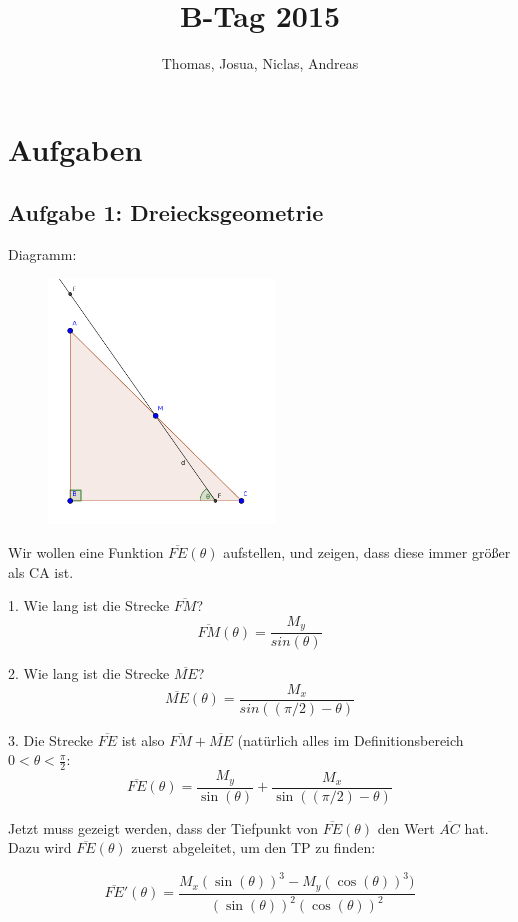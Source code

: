 \documentclass[a4paper,11pt]{article}
\title{B-Tag 2015}
\author{Thomas, Josua, Niclas, Andreas}
\begin{document}
\maketitle
\tableofcontents

\section{Aufgaben}
\subsection{Aufgabe 1: Dreiecksgeometrie}
Diagramm:

\begin{figure}[htbp] 
        \centering
        \includegraphics[width=6cm]{img/A1_1.png}
\end{figure}

Wir wollen eine Funktion $\overline{FE}(\theta)$ aufstellen, und zeigen, dass diese immer gr\"o\ss er als CA ist.

1. Wie lang ist die Strecke $\overline{FM}$?
\[ \overline{FM}(\theta) = \frac{M_y}{sin(\theta)} \]

2. Wie lang ist die Strecke $\overline{ME}$?
\[ \overline{ME}(\theta) = \frac{M_x}{sin((\pi/2)-\theta)} \]

3. Die Strecke $\overline{FE}$ ist also $\overline{FM} + \overline{ME}$ (natürlich alles im Definitionsbereich $0 < \theta < \frac{\pi}{2}$:
\[ \overline{FE}(\theta) = \frac{M_y}{\sin(\theta)} + \frac{M_x}{\sin((\pi/2)-\theta)} \]

Jetzt muss gezeigt werden, dass der Tiefpunkt von $\overline{FE}(\theta)$ den Wert $\overline{AC}$ hat. Dazu wird $\overline{FE}(\theta)$ zuerst abgeleitet, um den TP zu finden:

\[ \overline{FE}'(\theta) = \frac{M_x (\sin(\theta))^3 - M_y (\cos(\theta))^3)}{(\sin(\theta))^2 (\cos(\theta))^2} \]
\end{document}
